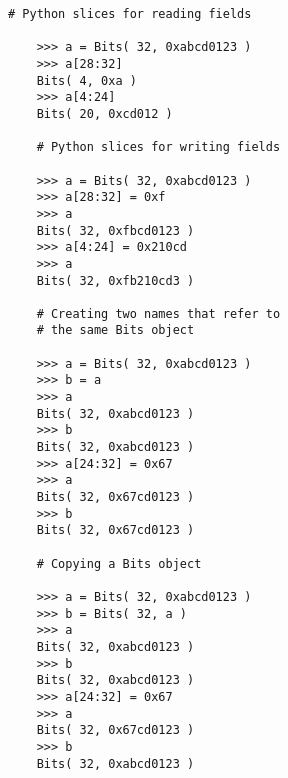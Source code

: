 

  \begin{lstlisting}[gobble=4]
    # Python slices for reading fields

    >>> a = Bits( 32, 0xabcd0123 )
    >>> a[28:32]
    Bits( 4, 0xa )
    >>> a[4:24]
    Bits( 20, 0xcd012 )

    # Python slices for writing fields

    >>> a = Bits( 32, 0xabcd0123 )
    >>> a[28:32] = 0xf
    >>> a
    Bits( 32, 0xfbcd0123 )
    >>> a[4:24] = 0x210cd
    >>> a
    Bits( 32, 0xfb210cd3 )

    # Creating two names that refer to
    # the same Bits object

    >>> a = Bits( 32, 0xabcd0123 )
    >>> b = a
    >>> a
    Bits( 32, 0xabcd0123 )
    >>> b
    Bits( 32, 0xabcd0123 )
    >>> a[24:32] = 0x67
    >>> a
    Bits( 32, 0x67cd0123 )
    >>> b
    Bits( 32, 0x67cd0123 )

    # Copying a Bits object

    >>> a = Bits( 32, 0xabcd0123 )
    >>> b = Bits( 32, a )
    >>> a
    Bits( 32, 0xabcd0123 )
    >>> b
    Bits( 32, 0xabcd0123 )
    >>> a[24:32] = 0x67
    >>> a
    Bits( 32, 0x67cd0123 )
    >>> b
    Bits( 32, 0xabcd0123 )
  \end{lstlisting}

  \label{code-tut3-basics-bits2}

